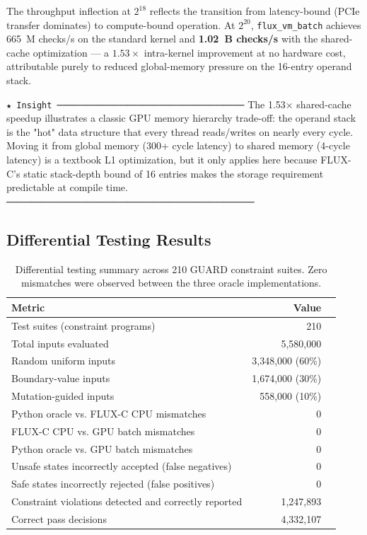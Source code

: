 \documentclass[sigplan,review,anonymous]{acmart}
\begin{document}
The throughput inflection at $2^{18}$ reflects the transition from
latency-bound (PCIe transfer dominates) to compute-bound operation.
At $2^{20}$, \texttt{flux\_vm\_batch} achieves 665~M checks/s on the
standard kernel and \textbf{1.02~B checks/s} with the shared-cache
optimization — a $1.53\times$ intra-kernel improvement at no hardware
cost, attributable purely to reduced global-memory pressure on the 16-entry
operand stack.

\texttt{★ Insight ─────────────────────────────────────}
The 1.53× shared-cache speedup illustrates a classic GPU memory hierarchy
trade-off: the operand stack is the "hot" data structure that every thread
reads/writes on nearly every cycle. Moving it from global memory (300+ cycle
latency) to shared memory (4-cycle latency) is a textbook L1 optimization,
but it only applies here because FLUX-C's static stack-depth bound of 16
entries makes the storage requirement predictable at compile time.
\texttt{─────────────────────────────────────────────────}

\subsection{Differential Testing Results}
\label{sec:eval-difftest}

\begin{table}[t]
\centering
\caption{Differential testing summary across 210 GUARD constraint suites.
Zero mismatches were observed between the three oracle implementations.}
\label{tab:difftest}
\renewcommand{\arraystretch}{1.15}
\begin{tabular}{lrr}
\toprule
\textbf{Metric} & \textbf{Value} \\
\midrule
Test suites (constraint programs)       & 210 \\
Total inputs evaluated                  & 5,580,000 \\
Random uniform inputs                   & 3,348,000 (60\%) \\
Boundary-value inputs                   & 1,674,000 (30\%) \\
Mutation-guided inputs                  & 558,000 (10\%) \\
\midrule
Python oracle vs. FLUX-C CPU mismatches & 0 \\
FLUX-C CPU vs. GPU batch mismatches     & 0 \\
Python oracle vs. GPU batch mismatches  & 0 \\
\midrule
Unsafe states incorrectly accepted (false negatives) & 0 \\
Safe states incorrectly rejected (false positives)   & 0 \\
\midrule
Constraint violations detected and correctly reported & 1,247,893 \\
Correct pass decisions                  & 4,332,107 \\
\bottomrule
\end{tabular}
\end{table}
\end{document}
